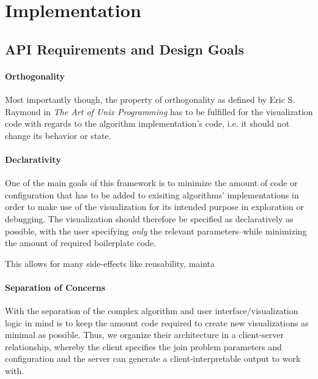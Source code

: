 \section{Implementation}
\label{sec:implementation}

\subsection{API Requirements and Design Goals}
\label{subsub:api-requirements-goals}

\paragraph{Orthogonality}
Most importantly though, the property  of orthogonality 
as defined by Eric S. Raymond in \textit{The Art of Unix
Programming} \cite{raymond2003compactness} has to be fulfilled for the visualization code with regards to the algorithm implementation's code, i.e. it should not change its behavior or state.

\paragraph{Declarativity} One of the main goals of this framework is to minimize 
the amount of code or configuration that has to be added to exisiting algorithms' implementations in order to make use of the visualization for its intended purpose in exploration or debugging. The visualization should therefore be specified as declaratively as 
possible, with the user specifying \textit{only} the relevant parameters–while minimizing the amount of required boilerplate code.

This allows for many side-effects like reusability, mainta

\paragraph{Separation of Concerns}
With the separation of the complex algorithm and user interface/visualization logic in mind is to keep the amount code required to create new visualizations as minimal as possible. 
Thus, we organize their architecture in a client-server 
relationship, whereby the client specifies the join 
problem parameters and configuration and the server can
generate a client-interpretable output to work with.

